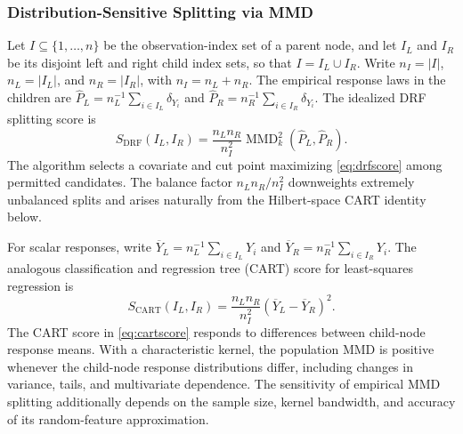 \documentclass[12pt,a4paper]{article}
\newcommand{\MMD}{\operatorname{MMD}}
\newcommand{\1}{\mathbf 1}
\begin{document}
\subsubsection{Distribution-Sensitive Splitting via MMD}
Let $I\subseteq\{1,\ldots,n\}$ be the observation-index set of a parent node, and let $I_L$ and $I_R$ be its disjoint left and right child index sets, so that $I=I_L\cup I_R$. Write $n_I=|I|$, $n_L=|I_L|$, and $n_R=|I_R|$, with $n_I=n_L+n_R$. The empirical response laws in the children are $\widehat P_L=n_L^{-1}\sum_{i\in I_L}\delta_{Y_i}$ and $\widehat P_R=n_R^{-1}\sum_{i\in I_R}\delta_{Y_i}$. The idealized DRF splitting score is
\begin{equation}\label{eq:drfscore}
 S_{\mathrm{DRF}}(I_L,I_R)=\frac{n_Ln_R}{n_I^2}\MMD_k^2(\widehat P_L,\widehat P_R).
\end{equation} 
The algorithm selects a covariate and cut point maximizing \eqref{eq:drfscore} among permitted candidates. The balance factor $n_Ln_R/n_I^2$ downweights extremely unbalanced splits and arises naturally from the Hilbert-space CART identity below.

For scalar responses, write $\overline Y_L=n_L^{-1}\sum_{i\in I_L}Y_i$ and $\overline Y_R=n_R^{-1}\sum_{i\in I_R}Y_i$. The analogous classification and regression tree (CART) score for least-squares regression is
\begin{equation}\label{eq:cartscore}
 S_{\mathrm{CART}}(I_L,I_R)=\frac{n_Ln_R}{n_I^2}(\overline Y_L-\overline Y_R)^2.
\end{equation}
The CART score in \eqref{eq:cartscore} responds to differences between child-node response means. With a characteristic kernel, the population MMD is positive whenever the child-node response distributions differ, including changes in variance, tails, and multivariate dependence. The sensitivity of empirical MMD splitting additionally depends on the sample size, kernel bandwidth, and accuracy of its random-feature approximation.
\end{document}
